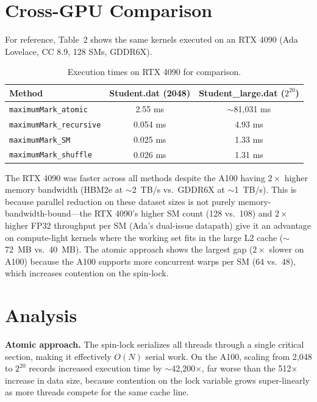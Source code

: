\documentclass[11pt]{article}
\begin{document}
\section*{Cross-GPU Comparison}

For reference, Table~2 shows the same kernels executed on an RTX 4090 (Ada Lovelace, CC 8.9, 128 SMs, GDDR6X).

\begin{table}[h]
\centering
\caption{Execution times on RTX 4090 for comparison.}
\begin{tabular}{lcc}
\toprule
\textbf{Method} & \textbf{Student.dat (2048)} & \textbf{Student\_large.dat ($2^{20}$)} \\
\midrule
\texttt{maximumMark\_atomic}     & 2.55 ms      & $\sim$81{,}031 ms \\
\texttt{maximumMark\_recursive}  & 0.054 ms     & 4.93 ms           \\
\texttt{maximumMark\_SM}         & 0.025 ms     & 1.33 ms           \\
\texttt{maximumMark\_shuffle}    & 0.026 ms     & 1.31 ms           \\
\bottomrule
\end{tabular}
\end{table}

\noindent The RTX 4090 was faster across all methods despite the A100 having $2\times$ higher memory bandwidth (HBM2e at $\sim$2~TB/s vs.\ GDDR6X at $\sim$1~TB/s).
This is because parallel reduction on these dataset sizes is not purely memory-bandwidth-bound---the RTX 4090's
higher SM count (128 vs.\ 108) and $2\times$ higher FP32 throughput per SM (Ada's dual-issue datapath) give it
an advantage on compute-light kernels where the working set fits in the large L2 cache ($\sim$72~MB vs.\ 40~MB).
The atomic approach shows the largest gap ($2\times$ slower on A100) because the A100 supports more concurrent warps
per SM (64 vs.\ 48), which increases contention on the spin-lock.

\section*{Analysis}

\textbf{Atomic approach.}
The spin-lock serializes all threads through a single critical section, making it effectively $O(N)$ serial work.
On the A100, scaling from 2{,}048 to $2^{20}$ records increased execution time by $\sim$42{,}200$\times$, far worse than the 512$\times$ increase in data size, because contention on the lock variable grows super-linearly as more threads compete for the same cache line.
\end{document}
